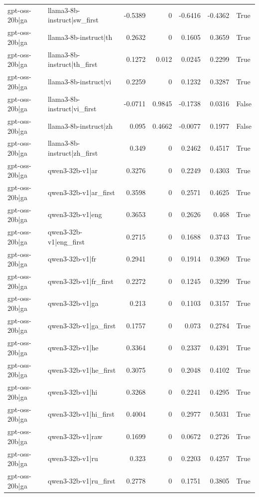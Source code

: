 \begin{table}
\begin{tabular}{l l r r r r l}
gpt-oss-20b|ga & llama3-8b-instruct|sw_first & -0.5389 & 0 & -0.6416 & -0.4362 & True \\
gpt-oss-20b|ga & llama3-8b-instruct|th & 0.2632 & 0 & 0.1605 & 0.3659 & True \\
gpt-oss-20b|ga & llama3-8b-instruct|th_first & 0.1272 & 0.012 & 0.0245 & 0.2299 & True \\
gpt-oss-20b|ga & llama3-8b-instruct|vi & 0.2259 & 0 & 0.1232 & 0.3287 & True \\
gpt-oss-20b|ga & llama3-8b-instruct|vi_first & -0.0711 & 0.9845 & -0.1738 & 0.0316 & False \\
gpt-oss-20b|ga & llama3-8b-instruct|zh & 0.095 & 0.4662 & -0.0077 & 0.1977 & False \\
gpt-oss-20b|ga & llama3-8b-instruct|zh_first & 0.349 & 0 & 0.2462 & 0.4517 & True \\
gpt-oss-20b|ga & qwen3-32b-v1|ar & 0.3276 & 0 & 0.2249 & 0.4303 & True \\
gpt-oss-20b|ga & qwen3-32b-v1|ar_first & 0.3598 & 0 & 0.2571 & 0.4625 & True \\
gpt-oss-20b|ga & qwen3-32b-v1|eng & 0.3653 & 0 & 0.2626 & 0.468 & True \\
gpt-oss-20b|ga & qwen3-32b-v1|eng_first & 0.2715 & 0 & 0.1688 & 0.3743 & True \\
gpt-oss-20b|ga & qwen3-32b-v1|fr & 0.2941 & 0 & 0.1914 & 0.3969 & True \\
gpt-oss-20b|ga & qwen3-32b-v1|fr_first & 0.2272 & 0 & 0.1245 & 0.3299 & True \\
gpt-oss-20b|ga & qwen3-32b-v1|ga & 0.213 & 0 & 0.1103 & 0.3157 & True \\
gpt-oss-20b|ga & qwen3-32b-v1|ga_first & 0.1757 & 0 & 0.073 & 0.2784 & True \\
gpt-oss-20b|ga & qwen3-32b-v1|he & 0.3364 & 0 & 0.2337 & 0.4391 & True \\
gpt-oss-20b|ga & qwen3-32b-v1|he_first & 0.3075 & 0 & 0.2048 & 0.4102 & True \\
gpt-oss-20b|ga & qwen3-32b-v1|hi & 0.3268 & 0 & 0.2241 & 0.4295 & True \\
gpt-oss-20b|ga & qwen3-32b-v1|hi_first & 0.4004 & 0 & 0.2977 & 0.5031 & True \\
gpt-oss-20b|ga & qwen3-32b-v1|raw & 0.1699 & 0 & 0.0672 & 0.2726 & True \\
gpt-oss-20b|ga & qwen3-32b-v1|ru & 0.323 & 0 & 0.2203 & 0.4257 & True \\
gpt-oss-20b|ga & qwen3-32b-v1|ru_first & 0.2778 & 0 & 0.1751 & 0.3805 & True \\

\end{tabular}
\end{table}
